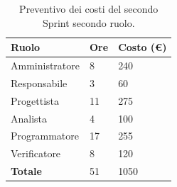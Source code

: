 \begin{table}[ht!]
	\centering
	\begin{tabular}{p{4cm} p{1cm} p{2cm}}
        \toprule
        \textbf{Ruolo} & \textbf{Ore} & \textbf{Costo (€)} \\
        \midrule
        Amministratore & 8 & 240 \\
        Responsabile & 3 & 60 \\
        Progettista & 11 & 275 \\
        Analista & 4 & 100 \\
        Programmatore & 17 & 255 \\
        Verificatore & 8 & 120 \\
        \bottomrule
        \textbf{Totale} & 51 & 1050
    \end{tabular}
    \caption{Preventivo dei costi del secondo Sprint secondo ruolo.}
	\label{table:Preventivo dei costi del secondo Sprint secondo ruolo}
\end{table}
